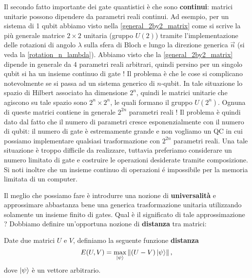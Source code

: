 \noindent Il secondo fatto importante dei gate quantistici è che sono \textbf{continui}: matrici unitarie possono dipendere da parametri reali continui. Ad esempio, per un sistema di 1 qubit abbiamo visto nella \eqref{general_2by2_matrix} come si scrive la più generale matrice $2 \times 2$ unitaria (gruppo $U(2)$) tramite l'implementazione delle rotazioni di angolo $\lambda$ sulla sfera di Bloch e lungo la direzione generica $\vec{n}$ (si veda la \eqref{rotation_n_lambda}). Abbiamo visto che la \eqref{general_2by2_matrix} dipende in generale da 4 parametri reali arbitrari, quindi persino per un singolo qubit si ha un insieme continuo di gate ! Il problema è che le cose si complicano notevolmente se si passa ad un sistema generico di $n$-qubit. In tale situazione lo spazio di Hilbert associato ha dimensione $2^n$, quindi le matrici unitarie che agiscono su tale spazio sono $2^n \times 2^n$, le quali formano il gruppo $U(2^n)$. Ognuna di queste matrici contiene in generale $2^{2n}$ parametri reali ! Il problema è quindi dato dal fatto che il numero di parametri cresce esponenzialmente con il numero di qubit: il numero di gate è estremamente grande e non vogliamo un QC in cui possiamo implementare qualsiasi trasformazione con $2^{2n}$ parametri reali. Una tale situazione è troppo difficile da realizzare, tuttavia preferiamo considerare un numero limitato di gate e costruire le operazioni desiderate tramite composizione. Si noti inoltre che un insieme continuo di operazioni é impossibile per la memoria limitata di un computer. 

\noindent Il meglio che possiamo fare è introdurre una nozione di \textbf{universalità} e approssimare abbastanza bene una generica trasformazione unitaria utilizzando solamente un insieme finito di gates. Qual è il significato di tale approssimazione ? Dobbiamo definire un'opportuna nozione di \textbf{distanza} tra matrici:

\begin{definizione}
    Date due matrici $U$ e $V$, definiamo la seguente funzione \textbf{distanza}
    \begin{equation*}
        E(U,V) = \max\limits_{\ket{\psi}} \norm{(U-V) \ket{\psi}} \, ,
    \end{equation*}
    dove $\ket{\psi}$ è un vettore arbitrario.
\end{definizione}

